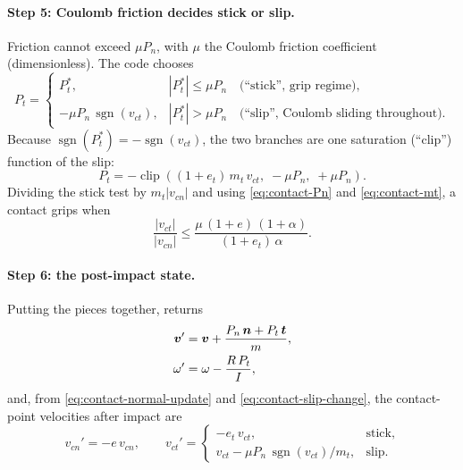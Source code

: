 \paragraph{Step 5: Coulomb friction decides stick or slip.}
Friction cannot exceed $\mu P_n$, with $\mu$ the Coulomb friction coefficient
(dimensionless). The code chooses
\begin{equation}
  P_t =
  \begin{cases}
    P_t^{*}, & |P_t^{*}| \le \mu P_n \quad\text{(``stick'', grip regime)},\\
    -\mu P_n\,\operatorname{sgn}(v_{ct}), & |P_t^{*}| > \mu P_n \quad\text{(``slip'', Coulomb sliding throughout)}.
  \end{cases}
  \label{eq:contact-coulomb}
\end{equation}
Because $\operatorname{sgn}(P_t^*)=-\operatorname{sgn}(v_{ct})$, the two branches are one
saturation (``clip'') function of the slip:
\begin{equation}
  P_t = -\operatorname{clip}\!\left((1+e_t)\,m_t\,v_{ct},\; -\mu P_n,\; +\mu P_n\right).
  \label{eq:contact-clip}
\end{equation}
Dividing the stick test by $m_t|v_{cn}|$ and using \eqref{eq:contact-Pn} and \eqref{eq:contact-mt}, a
contact grips when
\begin{equation}
  \frac{|v_{ct}|}{|v_{cn}|} \le \frac{\mu\,(1+e)\,(1+\alpha)}{(1+e_t)\,\alpha}.
  \label{eq:contact-stick-ratio}
\end{equation}

\paragraph{Step 6: the post-impact state.}
Putting the pieces together,  returns
\begin{align}
  \bm{v}' &= \bm{v} + \frac{P_n\,\bm{n} + P_t\,\bm{t}}{m},
  \label{eq:contact-vpost}\\
  \omega' &= \omega - \frac{R\,P_t}{I},
  \label{eq:contact-wpost}
\end{align}
and, from \eqref{eq:contact-normal-update} and \eqref{eq:contact-slip-change}, the contact-point velocities
after impact are
\begin{equation}
  v_{cn}' = -e\,v_{cn},
  \qquad
  v_{ct}' =
  \begin{cases}
    -e_t\,v_{ct}, & \text{stick},\\
    v_{ct} - \mu P_n\,\operatorname{sgn}(v_{ct})/m_t, & \text{slip}.
  \end{cases}
  \label{eq:contact-post-contact}
\end{equation}


